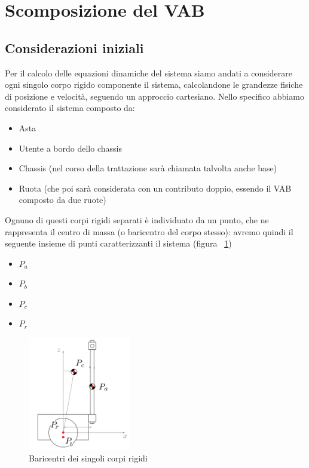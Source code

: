 \section{Scomposizione del VAB}
\subsection{Considerazioni iniziali}
Per il calcolo delle equazioni dinamiche del sistema siamo andati a considerare ogni singolo corpo rigido componente il sistema, calcolandone le grandezze fisiche di posizione e velocità, seguendo un approccio cartesiano. 
Nello specifico abbiamo considerato il sistema composto da:
\begin{itemize}
	\item Asta
	\item Utente a bordo dello chassis
	\item Chassis (nel corso della trattazione sarà chiamata talvolta anche base)
	\item Ruota (che poi sarà considerata con un contributo doppio, essendo il VAB composto da due ruote)
\end{itemize}

Ognuno di questi corpi rigidi separati è individuato da un punto, che ne rappresenta il centro di massa (o baricentro del corpo stesso): avremo quindi il seguente insieme di punti caratterizzanti il sistema (figura ~\ref{fig:VAB_baricentri})

\begin{itemize}
	\item \textbf{$P_a$}
	\item \textbf{$P_b$}
	\item \textbf{$P_c$}
	\item \textbf{$P_r$}
\end{itemize}

\begin{figure}[H]
	\centering   	
	\includegraphics[width=0.4\textwidth]{Immagini/VAB_baricentrum.png}
	\caption{Baricentri dei singoli corpi rigidi}
	\label{fig:VAB_baricentri}
\end{figure} 

